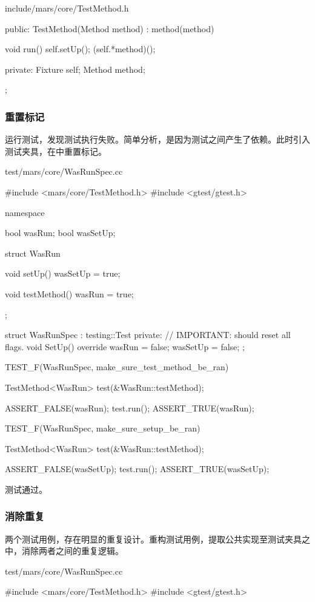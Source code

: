\begin{content}
\begin{diff}{include/mars/core/TestMethod.h}
\begin{minicpp}
{public:
  TestMethod(Method method)
    : method(method) {}

  void run() {
    self.setUp();
    (self.*method)();
  }

private:
  Fixture self;
  Method method;
};
\end{minicpp}
\end{diff}

\subsubsection{重置标记}

运行测试，发现测试执行失败。简单分析，是因为测试之间产生了依赖。此时引入测试夹具，在中重置标记。

\begin{nodiff}{test/mars/core/WasRunSpec.cc}
\begin{c++}
#include <mars/core/TestMethod.h>
#include <gtest/gtest.h>

namespace {
  bool wasRun;
  bool wasSetUp;

  struct WasRun {
    void setUp() {
      wasSetUp = true;
    }

    void testMethod() {
      wasRun = true;
    }
  };

  struct WasRunSpec : testing::Test {
  private:
    // IMPORTANT: should reset all flags.
    void SetUp() override {
      wasRun = false;
      wasSetUp = false;
    }
  };
}

TEST_F(WasRunSpec, make_sure_test_method_be_ran) {
  TestMethod<WasRun> test(&WasRun::testMethod);

  ASSERT_FALSE(wasRun);
  test.run();
  ASSERT_TRUE(wasRun);
}

TEST_F(WasRunSpec, make_sure_setup_be_ran) {
  TestMethod<WasRun> test(&WasRun::testMethod);

  ASSERT_FALSE(wasSetUp);
  test.run();
  ASSERT_TRUE(wasSetUp);
}
\end{c++}
\end{nodiff}

测试通过。

\subsubsection{消除重复}

两个测试用例，存在明显的重复设计。重构测试用例，提取公共实现至测试夹具之中，消除两者之间的重复逻辑。

\begin{nodiff}{test/mars/core/WasRunSpec.cc}
\begin{c++}
#include <mars/core/TestMethod.h>
#include <gtest/gtest.h>


\end{c++}
\end{nodiff}
\end{content}
